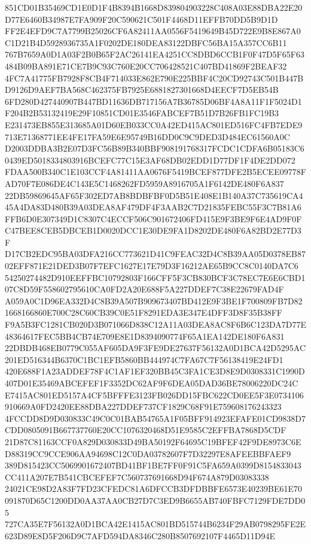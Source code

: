 \documentclass[UTF8,fontset=fandol,zihao=-4,a4paper]{ctexart}
\begin{document}
{{851CD01B35469CD1E0D1F4B8394B1668D839804903228C408A03E88DBA22E20D77E6460B34987E7FA909F20C590621C501F4468D11EFFB70DD5B9D1D
FF2E4EFD9C7A7799B25026CF6A82411AA0556F5419649B45D722E9B8E867A0C1D21B4D5928936735A1F0202DE180DEA83122DBFC56BA15A357CC6B11
767B7659A0D1A03F2B0B65F2AC26141EA4251CC8DBD6CCB1F0F47D5F65F63484B09BA891E71CE7B9C93C760E20CC706428521C407BD41869F2BEAF32
4FC7A41775FB7928F8CB4F714033E862E790E225BBF4C20CD92743C501B447BD9126D9AEF7BA568C462375FB7925E6881827301668D4EECF7D5EB54B
6FD280D427440907B447BD11636DB717156A7B36785D06BF4A8A11F1F5024D1F204B2B53132419E29F10851CD01E3546FABCEF7B51D7B26FB1FC19B3
E231473EB855E313685A01D60EB033CC0A42ED415AC801ED516FC4FB7EDE9713E71368771EE4FE17FA59E6E95749B16DD0C9C9DED3D484EC61560A0C
D2003DDBA3B2E07D3FC56B89B340BBF908191768317FCDC1CDFA6B05183C60439ED5018334803916BCEFC77C15E3AF68DB02EDD1D77DF1F4DE2DD072
FDAA500B340C1E103CCF4A81411AA0676F5419BCEF877DFE2B5ECEE09778FAD70F7E086DE4C143E5C1468262FD5959A8916705A1F6142DE480F6A837
22DB59869645AF65F302ED7AB8BDBFBF0D5B51E408E1B140A37C735619CA445A4DA83D480B39A03DEA8AF479DF4F3AAB2C7D21835FEBC55F3C7B81A6
FFB6D0E307349D1C8307C4ECCF506C901672406FD415E9F3BE9F6E4AD9F0FC47BEE8CEB5DBCEB1D0020DCC1E30DE9FA1D8202DE480F6A82BD2E77D3F
D17CB2EDC95BA03DFA216CC773621D41C9FEAC32D4C8B39AA05D0378EB8702EFF871E21DED3B07F7EFC1627E17E79D3F16212AE65B9CC8C0140DA7C6
54250274482D910EEFFBC10792803F166CFF5F3CB830BCF3C78EC7E6E6CBD107C8D59F558602795610CA0FD2A20E688F5A227DDEF7C38E22679FAD4F
A059A0C1D96EA332D4C8B39A507B909673407BD412E9F3BE1F700809FB7D821668166860E700C28C60CB39C0E51F8291EDA3E347E4DFF3D8F35B38FF
F9A5B3FC1281CB020D3B071066D838C12A11A03DEA8AC8F6B6C123DA7D77E48364617FEC5BB4CB74E709E8E1D8394090774F65A1EA142DE180F6A831
22DBDB468EB0779C055AF605DA9F3FE9DE27637F56132A0D1BCA42D5295AC201ED516344B6370C1BC1EFB5860BB444974C7FA67C7F56138419E24FD1
420E688F1A23ADDEF78F4C1AF1EF320BB45C3FA1CE3D8E9D0308331C1990D407D01E35469ABCEFEF1F3352DC62AF9F6DEA05DAD36BE78006220DC24C
E7415AC801ED5157A4CF5BFFFE3123FB026DD15FBC622CD0EE5F3E0734106910669A0FD2420EE88DBA227DDEF737CF1829C68F91E759608176243323
4FCCDD8D9D030833C49C0C01BAB54765A1F05BFF914923EFAFE01CD9838D7CDD0805091B667737760E20CC1076320468D51E9585C2EFFBA7868D5CDF
21D87C81163CCF0A829D030833D49BA50192F64695C19BFEF42F9DE8973C6ED88319CC9CCE906AA94698C12C0DA03782607F7D32297E8AFEEBBFAEF9
389D815423CC5069901672407BD41BF1BE7FF0F91C5FA659A0399D8154833043CC411A207E7B541CBCEFEF7C560737691668D94F674A879D03083338
24021CE98D2A83F7FD23CFEDC81A6DFCCB3DFDBBFE6573E40239BE61E70091870D65C1200DD0AA37AA0CB27D7C3ED9B6655AB740FBFC7129FDE7DD05
727CA35E7F56132A0D1BCA42E1415AC801BD515744B6234F29AB0798295FE2E623D89E8D5F206D9C7AFD594DA8346C280B8507692107F4465D11D94E
}}
\end{document}
